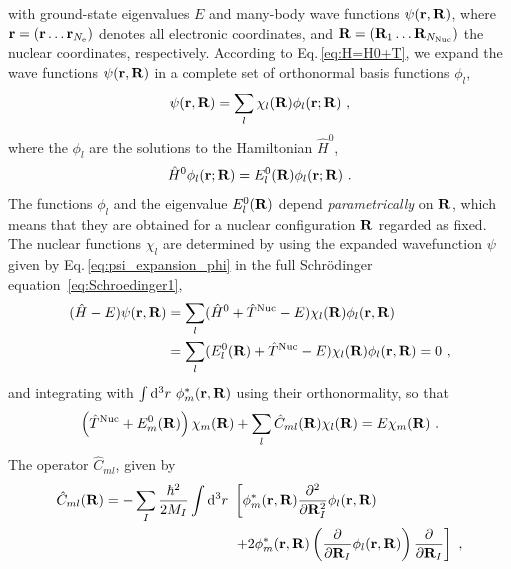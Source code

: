 with ground-state eigenvalues $E$ and many-body wave functions \mbox{$\psi ({\bf r}, {\bf R})$}, where {${\bf r} = ({\bf r} \ldots {\bf r}_{N_{\rm e}})$} denotes all electronic coordinates, and ${\bf R} = ({\bf R}_1 \ldots {\bf R}_{N_{\rm Nuc}})$ the nuclear coordinates, respectively. According to Eq.\,\eqref{eq:H=H0+T}, we expand the wave functions $\psi ({\bf r}, {\bf R})$ in a complete set of orthonormal basis functions $\phi_l$,
\begin{align}
\psi ({\bf r}, {\bf R}) = \sum_l \chi_l ({\bf R}) \phi_l ({\bf r}; {\bf R})~,
\label{eq:psi_expansion_phi}
\end{align}
where the $\phi_l$ are the solutions to the Hamiltonian $\hat{H}^0$,
\begin{align}
    \hat{H}^0 \phi_l ({\bf r}; {\bf R})
        = E^0_l ({\bf R}) \phi_l ({\bf r}; {\bf R})~.
    \label{eq:Hsolution1}
\end{align}
The functions $\phi_l$ and the eigenvalue $E_l^0({\bf R})$ depend \emph{parametrically} on $\bf R$, which means that they are obtained for a nuclear configuration $\bf R$ regarded as fixed.
The nuclear functions $\chi_l$ are determined by using the expanded wavefunction $\psi$ given by Eq.\,\eqref{eq:psi_expansion_phi} in the full Schr\"odinger equation~\eqref{eq:Schroedinger1},
\begin{align}
    (\hat{H} - E) \psi ({\bf r}, {\bf R})
        & = \sum_l (\hat{H}^0 + \hat{T}^{\rm Nuc} - E) \chi_l ({\bf R}) \phi_l ({\bf r}, {\bf R}) \nonumber \\
        &= \sum_l (E^0_l({\bf R}) + \hat{T}^{\rm Nuc} - E) \chi_l ({\bf R}) \phi_l ({\bf r}, {\bf R}) = 0~,
\end{align}
and integrating with $\int {\rm d}^3 r ~ \phi^\ast_m ({\bf r}, {\bf R})$ using their orthonormality, so that
\begin{align}
    \left( \hat{T}^{\rm Nuc} + E^0_m({\bf R}) \right) \chi_m ({\bf R})
        + \sum_l \hat{C}_{ml} ({\bf R}) \chi_l ({\bf R})
        = E \chi_m ({\bf R})~.
    \label{eq:chi1}
\end{align}
The operator $\hat{C}_{ml}$, given by
\begin{align}
    \hat{C}_{ml} ({\bf R})
        = - \sum_I \frac{\hbar^2}{2 M_I} \int \d^3 r ~ 
        &\left[ \phi^\ast_m ({\bf r}, {\bf R}) \frac{\partial^2}{\partial {\bf R}_I^2}
            \phi_l ({\bf r}, {\bf R}) \right. \nonumber \\
        &\left.
            + 2 \phi^\ast_m ({\bf r}, {\bf R}) \left(
                \frac{\partial}{\partial {\bf R}_I} \phi_l ({\bf r}, {\bf R}) \right)
            \frac{\partial}{\partial {\bf R}_I}
        \right]~,
    \label{eq:Aml}
\end{align}
